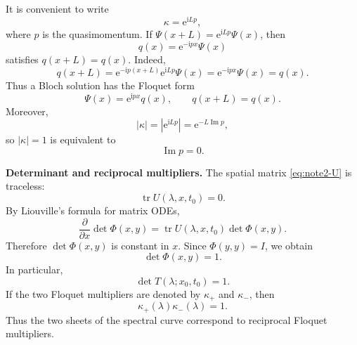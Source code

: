 \documentclass{amsart}
\newcounter{note}
\numberwithin{equation}{hw}
\newcommand{\noteheading}[1]{\vspace{1em}\noindent\textbf{#1}}
\begin{document}
It is convenient to write
\begin{equation}
\kappa=\mathrm{e}^{\mathrm{i}Lp},
\label{eq:note2-quasimomentum}
\end{equation}
where \(p\) is the quasimomentum.  If
\(\Psi(x+L)=\mathrm{e}^{\mathrm{i}Lp}\Psi(x)\), then
\begin{equation}
q(x)=\mathrm{e}^{-\mathrm{i}px}\Psi(x)
\label{eq:note2-periodic-factor}
\end{equation}
satisfies \(q(x+L)=q(x)\).  Indeed,
\[
q(x+L)
=
\mathrm{e}^{-\mathrm{i}p(x+L)}
\mathrm{e}^{\mathrm{i}Lp}\Psi(x)
=
\mathrm{e}^{-\mathrm{i}px}\Psi(x)
=
q(x).
\]
Thus a Bloch solution has the Floquet form
\begin{equation}
\Psi(x)=\mathrm{e}^{\mathrm{i}px}q(x),
\qquad
q(x+L)=q(x).
\label{eq:note2-floquet-form}
\end{equation}
Moreover,
\begin{equation}
|\kappa|
=
\left|\mathrm{e}^{\mathrm{i}Lp}\right|
=
\mathrm{e}^{-L\operatorname{Im}p},
\label{eq:note2-kappa-modulus}
\end{equation}
so \(|\kappa|=1\) is equivalent to
\begin{equation}
\operatorname{Im}p=0.
\label{eq:note2-real-quasimomentum}
\end{equation}

\noteheading{Determinant and reciprocal multipliers.}
The spatial matrix \eqref{eq:note2-U} is traceless:
\begin{equation}
\operatorname{tr}U(\lambda,x,t_0)=0.
\label{eq:note2-traceless-U}
\end{equation}
By Liouville's formula for matrix ODEs,
\begin{equation}
\frac{\partial}{\partial x}\det\Phi(x,y)
=
\operatorname{tr}U(\lambda,x,t_0)\det\Phi(x,y).
\label{eq:note2-liouville}
\end{equation}
Therefore \(\det\Phi(x,y)\) is constant in \(x\).  Since
\(\Phi(y,y)=I\), we obtain
\begin{equation}
\det\Phi(x,y)=1.
\label{eq:note2-det-fundamental}
\end{equation}
In particular,
\begin{equation}
\det T(\lambda;x_0,t_0)=1.
\label{eq:note2-det-monodromy}
\end{equation}
If the two Floquet multipliers are denoted by \(\kappa_+\) and
\(\kappa_-\), then
\begin{equation}
\kappa_+(\lambda)\kappa_-(\lambda)=1.
\label{eq:note2-reciprocal-multipliers}
\end{equation}
Thus the two sheets of the spectral curve correspond to reciprocal
Floquet multipliers.
\end{document}
